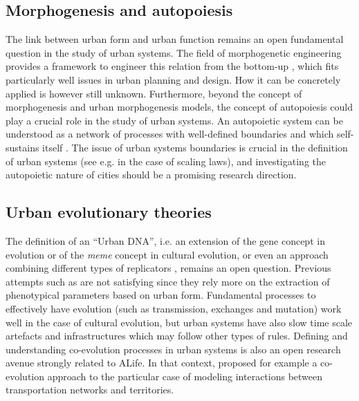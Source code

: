 \documentclass[10pt]{article}
\begin{document}
\subsection{Morphogenesis and autopoiesis}



The link between urban form and urban function remains an open fundamental question in the study of urban systems. The field of morphogenetic engineering provides a framework to engineer this relation from the bottom-up \citep{doursat2012morphogenetic}, which fits particularly well issues in urban planning and design. How it can be concretely applied is however still unknown. Furthermore, beyond the concept of morphogenesis and urban morphogenesis models, the concept of autopoiesis could play a crucial role in the study of urban systems. An autopoietic system can be understood as a network of processes with well-defined boundaries and which self-sustains itself \citep{bourgine2004autopoiesis}. The issue of urban systems boundaries is crucial in the definition of urban systems (see e.g. \citep{cottineau2017diverse} in the case of scaling laws), and investigating the autopoietic nature of cities should be a promising research direction.



\subsection{Urban evolutionary theories}




The definition of an ``Urban DNA'', i.e. an extension of the gene concept in evolution or of the \emph{meme} concept in cultural evolution, or even an approach combining different types of replicators \citep{bull2000meme}, remains an open question. Previous attempts such as \citep{votsis2019urban} are not satisfying since they rely more on the extraction of phenotypical parameters based on urban form. Fundamental processes to effectively have evolution (such as transmission, exchanges and mutation) work well in the case of cultural evolution, but urban systems have also slow time scale artefacts and infrastructures which may follow other types of rules. Defining and understanding co-evolution processes in urban systems is also an open research avenue strongly related to ALife. In that context, \cite{raimbault2019modeling} proposed for example a co-evolution approach to the particular case of modeling interactions between transportation networks and territories.
\end{document}
